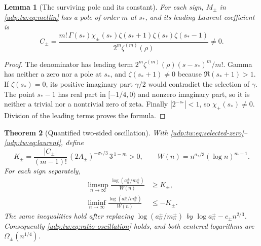 \documentclass[11pt]{article}
\newtheorem{theorem}{Theorem}[section]
\newtheorem{lemma}[theorem]{Lemma}
\theoremstyle{remark}\newtheorem{remark}[theorem]{Remark}
\numberwithin{equation}{section}
\begin{document}
\begin{lemma}[The surviving pole and its constant]\label{udp:tw:lem:pole}
For each sign, $M_\pm$ in \eqref{udp:tw:eq:mellin} has a pole of order
$m$ at $s_*$, and its leading Laurent coefficient is
\begin{equation}
 C_\pm=
 \frac{m!\,\Gamma(s_*)\chi_\pm(s_*)
       \zeta(s_*+1)\zeta(s_*)\zeta(s_*-1)}
      {2^m\zeta^{(m)}(\rho)}
 \ne0.
 \label{udp:tw:eq:laurent}
\end{equation}
\end{lemma}

\begin{proof}
The denominator has leading term
$2^m\zeta^{(m)}(\rho)(s-s_*)^m/m!$.
Gamma has neither a zero nor a pole at $s_*$, and
$\zeta(s_*+1)\ne0$ because $\Re(s_*+1)>1$.
If $\zeta(s_*)=0$, its positive imaginary part $\gamma/2$ would
contradict the selection of $\gamma$.
The point $s_*-1$ has real part in $[-1/4,0)$ and nonzero imaginary
part, so it is neither a trivial nor a nontrivial zero of zeta.
Finally $|2^{-s_*}|<1$, so $\chi_+(s_*)\ne0$.
Division of the leading terms proves the formula.
\end{proof}

\begin{theorem}[Quantified two-sided oscillation]\label{udp:tw:thm:main}
With \eqref{udp:tw:eq:selected-zero}--\eqref{udp:tw:eq:laurent}, define
\[
 K_\pm=
 \frac{|C_\pm|}{(m-1)!}\,
 (2A_\pm)^{-\sigma_*/3}\,3^{\,1-m}>0,
 \qquad
 W(n)=n^{\sigma_*/3}(\log n)^{m-1}.
\]
For each sign separately,
\begin{align}
 \limsup_{n\to\infty}
 \frac{\log(a_n^\pm/m_n^\pm)}{W(n)}&\ge K_\pm,\nonumber\\
 \liminf_{n\to\infty}
 \frac{\log(a_n^\pm/m_n^\pm)}{W(n)}&\le-K_\pm.
 \label{udp:tw:eq:main}
\end{align}
The same inequalities hold after replacing
$\log(a_n^\pm/m_n^\pm)$ by $\log a_n^\pm-c_\pm n^{2/3}$.
Consequently \eqref{udp:tw:eq:ratio-oscillation} holds, and both centered
logarithms are $\Omega_\pm(n^{1/4})$.
\end{theorem}
\end{document}
